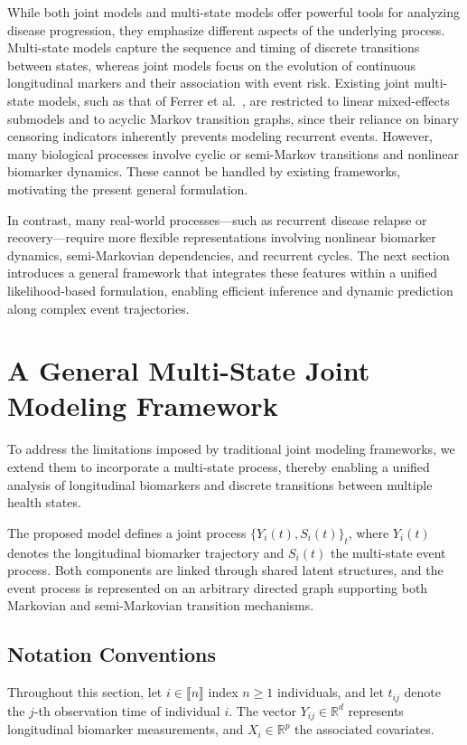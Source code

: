 \documentclass{sn-jnl}
\begin{document}
While both joint models and multi-state models offer powerful tools for analyzing disease progression, they emphasize different aspects of the underlying process. Multi-state models capture the sequence and timing of discrete transitions between states, whereas joint models focus on the evolution of continuous longitudinal markers and their association with event risk. Existing joint multi-state models, such as that of Ferrer et al.~\citep*{ferrer2016joint}, are restricted to linear mixed-effects submodels and to acyclic Markov transition graphs, since their reliance on binary censoring indicators inherently prevents modeling recurrent events. However, many biological processes involve cyclic or semi-Markov transitions and nonlinear biomarker dynamics. These cannot be handled by existing frameworks, motivating the present general formulation.

In contrast, many real-world processes—such as recurrent disease relapse or recovery—require more flexible representations involving nonlinear biomarker dynamics, semi-Markovian dependencies, and recurrent cycles. The next section introduces a general framework that integrates these features within a unified likelihood-based formulation, enabling efficient inference and dynamic prediction along complex event trajectories.

\section{A General Multi-State Joint Modeling Framework}

To address the limitations imposed by traditional joint modeling frameworks, we extend them to incorporate a multi-state process, thereby enabling a unified analysis of longitudinal biomarkers and discrete transitions between multiple health states.

The proposed model defines a joint process $\{Y_i(t), S_i(t)\}_t$, where $Y_i(t)$ denotes the longitudinal biomarker trajectory and $S_i(t)$ the multi-state event process. Both components are linked through shared latent structures, and the event process is represented on an arbitrary directed graph supporting both Markovian and semi-Markovian transition mechanisms.

\subsection{Notation Conventions}

Throughout this section, let $i \in \llbracket n \rrbracket$ index $n \geq 1$ individuals, and let $t_{ij}$ denote the $j$-th observation time of individual $i$. The vector $Y_{ij} \in \mathbb{R}^d$ represents longitudinal biomarker measurements, and $X_i \in \mathbb{R}^p$ the associated covariates.  
\end{document}

